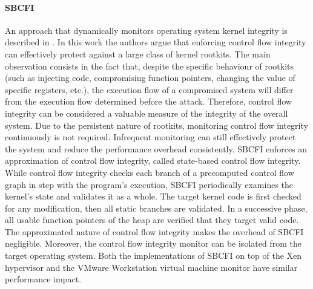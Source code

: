 \paragraph{SBCFI}
An approach that dynamically monitors operating system kernel integrity is described in \cite{SBCFI}. In this work the authors argue that enforcing control flow integrity can effectively protect against a large class of kernel rootkits. The main observation consists in the fact that, despite the specific behaviour of rootkits (such as injecting code, compromising function pointers, changing the value of specific registers, etc.), the execution flow of a compromised system will differ from the execution flow determined before the attack.
Therefore, control flow integrity can be considered a valuable measure of the integrity of the overall system.
Due to the persistent nature of rootkits, monitoring control flow integrity continuously is not required. Infrequent monitoring can still effectively protect the system and reduce the performance overhead consistently.
SBCFI enforces an approximation of control flow integrity, called state-based control flow integrity. While control flow integrity checks each branch of a precomputed control flow graph in step with the program's execution, SBCFI periodically examines the kernel's state and validates it as a whole.
The target kernel code is first checked for any modification, then all static branches are validated. In a successive phase, all usable function pointers of the heap are verified that they target valid code.
The approximated nature of control flow integrity makes the overhead of SBCFI negligible. Moreover, the control flow integrity monitor can be isolated from the target operating system. 
Both the implementations of SBCFI on top of the Xen hypervisor and the VMware Workstation virtual machine monitor have similar performance impact.



